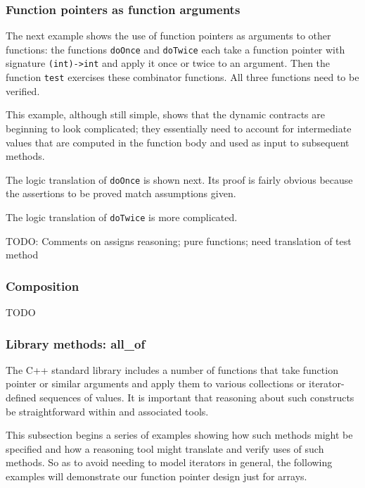 \subsubsection{Function pointers as function arguments}
The next example shows the use of function pointers as arguments to other functions: the functions \lstinline|doOnce|
and \lstinline|doTwice| each take a function pointer with signature \lstinline|(int)->int| and apply it once or twice to an
argument. Then the function \lstinline|test| exercises these combinator functions. All three functions need to be verified.



This example, although still simple, shows that the dynamic contracts
are beginning to look complicated; they essentially need to account
for intermediate values that are computed in the function body and used as input to subsequent methods.


 
The logic translation of \lstinline|doOnce| is shown next. Its proof is fairly obvious because the assertions to be proved match 
assumptions given.



The logic translation of \lstinline|doTwice| is more complicated.



TODO: Comments on assigns reasoning; pure functions; need translation of test method

\subsubsection{Composition}

TODO

\subsubsection{Library methods: all\_of}
\label{sec:libraryMethods}
The C++ standard library includes a number of functions that take function pointer or similar arguments and apply them to various 
collections or iterator-defined sequences of values. 
It is important
that reasoning about such constructs be straightforward within \NAME and
associated tools. 

This subsection begins a series of examples showing how such methods might be 
specified and how a reasoning tool might translate and verify uses of such methods. So as to avoid needing to model iterators in general, the 
following examples will demonstrate our function pointer design just
for arrays.

